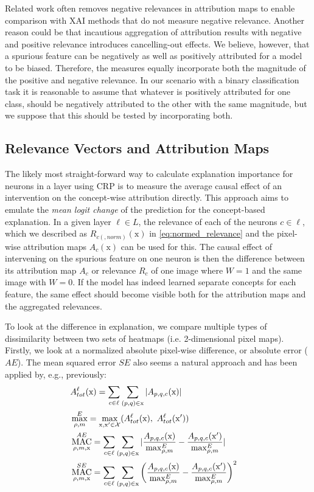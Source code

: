 Related work often removes negative relevances in attribution maps to enable comparison with XAI methods that do not measure negative relevance. Another reason could be that incautious aggregation of attribution results with negative and positive relevance introduces cancelling-out effects. We believe, however, that a spurious feature can be negatively as well as positively attributed for a model to be biased. Therefore, the measures equally incorporate both the magnitude of the positive and negative relevance. In our scenario with a binary classification task it is reasonable to assume that whatever is positively attributed for one class, should be negatively attributed to the other with the same magnitude, but we suppose that this should be tested by incorporating both.

\subsection{Relevance Vectors and Attribution Maps}\label{section:measure_mac}
The likely most straight-forward way to calculate explanation importance for neurons in a layer using CRP is to measure the average causal effect of an intervention on the concept-wise attribution directly. This approach aims to emulate the \textit{mean logit change} of the prediction for the concept-based explanation. In a given layer $\ell \in L$, the relevance of each of the neurons $c \in \ell$, which we described as $R_{c(,norm)}(\mathrm{x})$ in \cref{eq:normed_relevance} and the pixel-wise attribution maps $A_c(\mathrm{x})$ can be used for this.
The causal effect of intervening on the spurious feature on one neuron is then the difference between its attribution map $A_c$ or relevance $R_c$ of one image where $W=1$ and the same image with $W=0$. If the model has indeed learned separate concepts for each feature, the same effect should become visible both for the attribution maps and the aggregated relevances.

To look at the difference in explanation, we compare multiple types of dissimilarity between two sets of heatmaps (i.e. 2-dimensional pixel maps). Firstly, we look at a normalized absolute pixel-wise difference, or absolute error ($AE$). The mean squared error $SE$ also seems a natural approach and has been applied by, e.g., \citet{Karimi2023} previously: 
\begin{align}
\displaystyle 
& A_{tot}^{\ell}(\mathrm{x}) = \sum_{c \in \ell} \sum_{(p,q) \in \mathrm{x}} |A_{p,q,c}(\mathrm{x})|  \label{eq:tot_abs_norm1} & \\
& \max_{\rho, m}^E = \max_{\mathrm{x},\mathrm{x'} \in \mathcal{X}} (A_{tot}^{\ell}(\mathrm{x}) , \  A_{tot}^{\ell}(\mathrm{x'}) ) \label{eq:tot_abs_norm2}  & \\
& \operatorname*{MAC}_{\rho, m, \mathrm{x}}^{AE} = 
\sum_{c \in \ell} \sum_{(p,q) \in \mathrm{x}}| \frac{A_{p,q,c}(\mathrm{x})}{\max_{\rho, m}^E} -\frac{A_{p,q,c}(\mathrm{x'})}{\max_{\rho, m}^E}| & \\
& \operatorname*{MAC}_{\rho, m, \mathrm{x}}^{SE} = 
\sum_{c \in \ell} \sum_{(p,q) \in \mathrm{x}} \left( \frac{A_{p,q,c}(\mathrm{x})}{\max_{\rho, m}^E} -\frac{A_{p,q,c}(\mathrm{x'})}{\max_{\rho, m}^E}\right) ^2 & 
\end{align}

